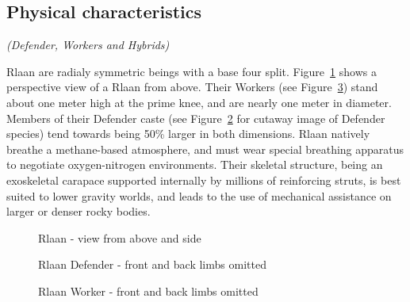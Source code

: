 \subsection{Physical characteristics} 
{\em (Defender, Workers and Hybrids)}

Rlaan are radialy symmetric beings with a base four
split. Figure~\ref{fig:Rlaan-perspective} shows a perspective view of
a Rlaan from above. Their Workers (see
Figure~\ref{fig:Rlaan-worker-cutaway}) stand about one meter high at
the prime knee, and are nearly one meter in diameter. Members of their
Defender caste (see Figure~\ref{fig:Rlaan-defender-cutaway} for
cutaway image of Defender species) tend towards being 50\% larger in
both dimensions. Rlaan natively breathe a methane-based atmosphere,
and must wear special breathing apparatus to negotiate oxygen-nitrogen
environments. Their skeletal structure, being an exoskeletal carapace
supported internally by millions of reinforcing struts, is best suited
to lower gravity worlds, and leads to the use of mechanical assistance
on larger or denser rocky bodies.

\begin{figure}
\begin{center}
    \caption{Rlaan - view from above and side}
    \label{fig:Rlaan-perspective}
\end{center}
\end{figure}
\begin{figure}
\begin{center}
    \caption{Rlaan Defender - front and back limbs omitted}
    \label{fig:Rlaan-defender-cutaway}
\end{center}
\end{figure}
\begin{figure}
\begin{center}
    \caption{Rlaan Worker - front and back limbs omitted}
    \label{fig:Rlaan-worker-cutaway}
\end{center}
\end{figure}

